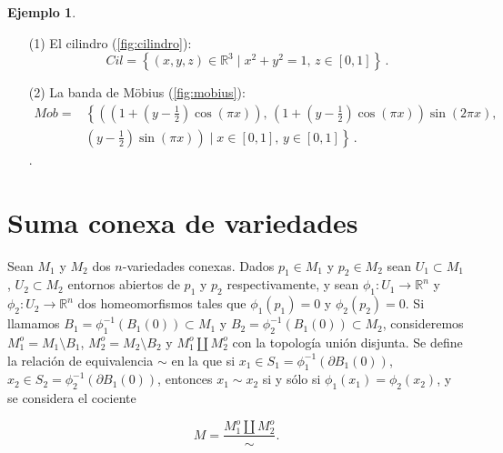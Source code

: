 \documentclass[10pt]{report}
\newcommand{\R}{\mathbb{R}}
\theoremstyle{definition}
\newtheorem{eje}[defin]{Ejemplo}
\begin{document}
\begin{eje}\label{eje:rep_borde}
\begin{itemize}
\item[(1)] El cilindro  (\autoref{fig:cilindro}): $$Cil=\left\{(x,y,z)\in \R^3 \mid x^2+y^2=1,\, z\in \left[ 0,1\right] \right\} \,.$$
\item[(2)] La banda de Möbius (\autoref{fig:mobius}):
\begin{align*}
Mob=
& \left\{ \left(\left(1+\left(y-\frac{1}{2}\right)\cos \left(\pi x\right)\right), \, \left(1+\left(y-\frac{1}{2}\right)\cos \left(\pi x\right)\right)\sin \left( 2 \pi x\right), \right. \right.\\
& \left. \left. \left( y-\frac{1}{2} \right)\sin \left( \pi x\right)\right) \mid x\in \left[0,1\right], \, y\in \left[0,1\right] \right\} \, .
\end{align*}.
\end{itemize}
\end{eje}

\section{Suma conexa de variedades}
Sean $M_1$ y $M_2$ dos $n$-variedades conexas. Dados $p_1\in M_1$ y $p_2\in M_2$ sean $U_1\subset M_1$, $U_2\subset M_2$  entornos abiertos de $p_1$ y $p_2$ respectivamente, y sean $\phi_1:U_1\to\R^n$ y $\phi_2:U_2\to\R^n$ dos homeomorfismos tales que $\phi_1(p_1)=0$ y $\phi_2(p_2)=0$. Si llamamos $B_1=\phi_1^{-1}(B_1(0))\subset M_1$ y $B_2=\phi_2^{-1}(B_1(0))\subset M_2$, consideremos $M_1^o=M_1\setminus B_1$, $M_2^o=M_2\setminus B_2$ y $M_1^o \amalg M_2^o$ con la topología unión disjunta.
Se define la relación de equivalencia $\sim$ en la que si $x_1\in S_1=\phi_1^{-1}(\partial B_1(0))$, $x_2\in S_2=\phi_2^{-1}(\partial B_1(0))$, entonces $x_1\sim x_2$ si y sólo si $\phi_1(x_1)=\phi_2(x_2)$, y se considera el cociente 

$$M=\frac{M_1^o\amalg M_2^o}{\sim}.$$
\end{document}

